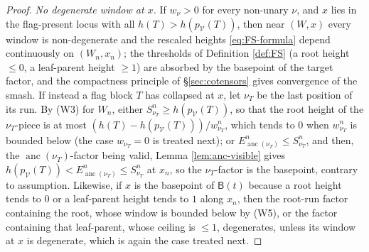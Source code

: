 \documentclass[12pt]{amsart}
\theoremstyle{definition}
\theoremstyle{remark}
\newcommand{\Cal}[1]{\mathcal{#1}}
\newcommand{\BC}{\mathsf{B}}                     %
\newcommand{\anc}{\operatorname{anc}}            %
\begin{document}
\begin{proof}
\emph{No degenerate window at $x$.} If $w_\nu > 0$ for every non-unary $\nu$, and $x$ lies in the flag-present locus with all $h(T) > h(p_{\Cal V}(T))$, then near $(W,x)$ every window is non-degenerate and the rescaled heights \eqref{eq:FS-formula} depend continuously on $(W_n,x_n)$; the thresholds of Definition \ref{def:FS} (a root height $\leq 0$, a leaf-parent height $\geq 1$) are absorbed by the basepoint of the target factor, and the compactness principle of \S\ref{sec:cotensors} gives convergence of the smash. If instead a flag block $T$ has collapsed at $x$, let $\nu_T$ be the last position of its run. By (W3) for $W_n$, either $S^n_{\nu_T}\geq h(p_{\Cal V}(T))$, so that the root height of the $\nu_T$-piece is at most $(h(T) - h(p_{\Cal V}(T)))/w^n_{\nu_T}$, which tends to $0$ when $w^n_{\nu_T}$ is bounded below (the case $w_{\nu_T} = 0$ is treated next); or $E^n_{\anc(\nu_T)}\leq S^n_{\nu_T}$, and then, the $\anc(\nu_T)$-factor being valid, Lemma \ref{lem:anc-visible} gives $h(p_{\Cal V}(T)) < E^n_{\anc(\nu_T)}\leq S^n_{\nu_T}$ at $x_n$, so the $\nu_T$-factor is the basepoint, contrary to assumption. Likewise, if $x$ is the basepoint of $\BC(t)$ because a root height tends to $0$ or a leaf-parent height tends to $1$ along $x_n$, then the root-run factor containing the root, whose window is bounded below by (W5), or the factor containing that leaf-parent, whose ceiling is $\leq 1$, degenerates, unless its window at $x$ is degenerate, which is again the case treated next.


\end{proof}
\end{document}
